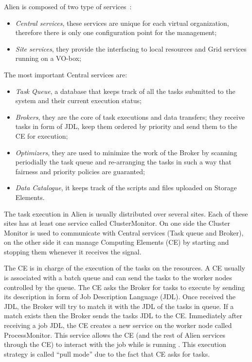 Alien is composed of two type of services~\cite{Bagnasco2010}:

\begin{itemize}
    \item \emph{Central services}, these services are unique for each virtual organization, therefore there is only one configuration point for the management;
    \item \emph{Site services}, they provide the interfacing to local resources and Grid services running on a VO-box;
\end{itemize}

The most important Central services are:
\begin{itemize}
    \item \emph{Task Queue}, a database that keeps track of all the tasks submitted to the system and their current execution status;
    \item \emph{Brokers}, they are the core of task executions and data transfers; they receive tasks in form of JDL,  keep them ordered by priority and send them to the CE for execution;
    \item \emph{Optimizers}, they are used to minimize the work of the Broker by scanning periodially the task queue and re-arranging the tasks in such a way that fairness and priority policies are guaranted;
    \item \emph{Data Catalogue}, it keeps track of the scripts and files uploaded on Storage Elements.
\end{itemize}



The task execution in Alien is usually distributed over several sites. Each of these sites has at least one service called ClusterMonitor. On one side the Cluster Monitor is used to communicate with Central services (Task queue and Broker), on the other side it can manage Computing Elements (CE) by starting and stopping them whenever it receives the signal.

The CE is in charge of the execution of the tasks on the resources. A CE usually
is associated with a batch queue and can send the tasks to the worker nodes
controlled by the queue. The CE asks the Broker for tasks to execute by sending
its description in form of Job Description Language (JDL). Once received the
JDL, the Broker will try to match it with the JDL of the tasks in queue. If a
match exists then the Broker sends the tasks JDL to the CE. Immediately after
receiving a job JDL, the CE creates a new service on the worker node called
ProcessMonitor. This service allows the CE (and the rest of Alien services
through the CE) to interact with the job while is running \cite{Saiz2003}. This
execution strategy is called ``pull mode'' due to the fact that CE asks for
tasks.

